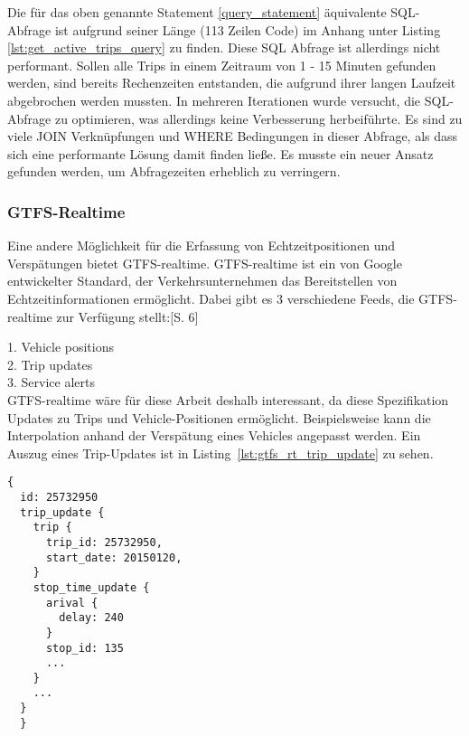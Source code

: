         Die für das oben genannte Statement \ref{query_statement} äquivalente SQL-Abfrage ist aufgrund seiner Länge (113 Zeilen Code) im Anhang unter Listing \ref{lst:get_active_trips_query} zu finden. Diese SQL Abfrage ist allerdings nicht performant. Sollen alle Trips in einem Zeitraum von 1 - 15 Minuten gefunden werden, sind bereits Rechenzeiten entstanden, die aufgrund ihrer langen Laufzeit abgebrochen werden mussten. In mehreren Iterationen wurde versucht, die SQL-Abfrage zu optimieren, was allerdings keine Verbesserung herbeiführte. Es sind zu viele JOIN Verknüpfungen und WHERE Bedingungen in dieser Abfrage, als dass sich eine performante Lösung damit finden ließe. Es musste ein neuer Ansatz gefunden werden, um Abfragezeiten erheblich zu verringern.
    
    \subsubsection{GTFS-Realtime}
    \label{ssub:gtfs_realtime}
      Eine andere Möglichkeit für die Erfassung von Echtzeitpositionen und Verspätungen bietet GTFS-realtime. GTFS-realtime ist ein von Google entwickelter Standard, der Verkehrsunternehmen das Bereitstellen von Echtzeitinformationen ermöglicht. Dabei gibt es 3 verschiedene Feeds, die GTFS-realtime zur Verfügung stellt:\parencite{zervaas_realtime}[S. 6]

      1. Vehicle positions\\
      2. Trip updates\\
      3. Service alerts\\

      GTFS-realtime wäre für diese Arbeit deshalb interessant, da diese Spezifikation Updates zu Trips und Vehicle-Positionen ermöglicht. Beispielsweise kann die Interpolation anhand der Verspätung eines Vehicles angepasst werden. Ein Auszug eines Trip-Updates ist in Listing~\ref{lst:gtfs_rt_trip_update} zu sehen.

      \begin{lstlisting}[captionpos=b, caption={Auszug eines GTFS-realtime Trip Updates von MBTA},label={lst:gtfs_rt_trip_update}]
  {
  id: 25732950
  trip_update {
    trip {
      trip_id: 25732950,
      start_date: 20150120,
    }
    stop_time_update {
      arival {
        delay: 240
      }
      stop_id: 135
      ...
    }
    ...
  }
  }
    \end{lstlisting}

